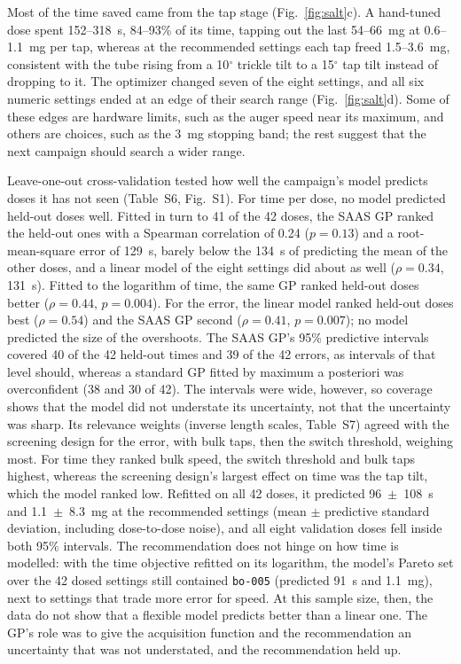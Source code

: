 \documentclass[preprint,12pt]{elsarticle}
\begin{document}
Most of the time saved came from the tap stage (Fig.~\ref{fig:salt}c). A hand-tuned dose spent 152--318~s, 84--93\% of its time, tapping out the last 54--66~mg at 0.6--1.1~mg per tap, whereas at the recommended settings each tap freed 1.5--3.6~mg, consistent with the tube rising from a 10$^\circ$ trickle tilt to a 15$^\circ$ tap tilt instead of dropping to it. The optimizer changed seven of the eight settings, and all six numeric settings ended at an edge of their search range (Fig.~\ref{fig:salt}d). Some of these edges are hardware limits, such as the auger speed near its maximum, and others are choices, such as the 3~mg stopping band; the rest suggest that the next campaign should search a wider range.

Leave-one-out cross-validation tested how well the campaign's model predicts doses it has not seen (Table~S6, Fig.~S1). For time per dose, no model predicted held-out doses well. Fitted in turn to 41 of the 42 doses, the SAAS GP ranked the held-out ones with a Spearman correlation of 0.24 ($p = 0.13$) and a root-mean-square error of 129~s, barely below the 134~s of predicting the mean of the other doses, and a linear model of the eight settings did about as well ($\rho = 0.34$, 131~s). Fitted to the logarithm of time, the same GP ranked held-out doses better ($\rho = 0.44$, $p = 0.004$). For the error, the linear model ranked held-out doses best ($\rho = 0.54$) and the SAAS GP second ($\rho = 0.41$, $p = 0.007$); no model predicted the size of the overshoots. The SAAS GP's 95\% predictive intervals covered 40 of the 42 held-out times and 39 of the 42 errors, as intervals of that level should, whereas a standard GP fitted by maximum a posteriori was overconfident (38 and 30 of 42). The intervals were wide, however, so coverage shows that the model did not understate its uncertainty, not that the uncertainty was sharp. Its relevance weights (inverse length scales, Table~S7) agreed with the screening design for the error, with bulk taps, then the switch threshold, weighing most. For time they ranked bulk speed, the switch threshold and bulk taps highest, whereas the screening design's largest effect on time was the tap tilt, which the model ranked low. Refitted on all 42 doses, it predicted 96~$\pm$~108~s and 1.1~$\pm$~8.3~mg at the recommended settings (mean $\pm$ predictive standard deviation, including dose-to-dose noise), and all eight validation doses fell inside both 95\% intervals. The recommendation does not hinge on how time is modelled: with the time objective refitted on its logarithm, the model's Pareto set over the 42 dosed settings still contained \texttt{bo-005} (predicted 91~s and 1.1~mg), next to settings that trade more error for speed. At this sample size, then, the data do not show that a flexible model predicts better than a linear one. The GP's role was to give the acquisition function and the recommendation an uncertainty that was not understated, and the recommendation held up.
\end{document}

